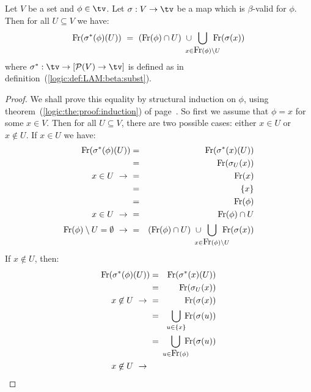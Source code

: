 \begin{prop}\label{logic:prop:LAM:freevar:of:betasubst:gen:valid}
    Let $V$ be a set and $\phi\in\tv$. Let $\sigma:V\to\tv$ be a map 
    which is $\beta$-valid for $\phi$. Then for all $U\subseteq V$ we have:
    \[
        \free(\sigma^{*}(\phi)(U)) 
            \ =\ 
        (\free(\phi)\cap U)
        \ \cup
        \!\!\!\!\!\!
        \bigcup_{x\in\free(\phi)\setminus U} 
        \!\!\!\!\!\!
        \free(\sigma(x))
    \]
    where $\sigma^{*}:\tv\to[{\cal P}(V)\to\tv]$ is defined as in 
    definition~(\ref{logic:def:LAM:beta:subst}).
\end{prop}
\begin{proof}
    We shall prove this equality by structural induction on $\phi$, using
    theorem~(\ref{logic:the:proof:induction}) of 
    page~\pageref{logic:the:proof:induction}. So first we assume that $\phi=x$ 
    for some $x\in V$. Then for all $U\subseteq V$, there are two possible 
    cases: either $x\in U$ or $x\not\in U$. If $x\in U$ we have:
    \begin{eqnarray*}
        \free(\sigma^{*}(\phi)(U))
        &=&\free(\sigma^{*}(x)(U))\\
        &=&\free(\sigma_{U}(x))\\
        \mbox{$x\in U\ \rightarrow\ $}&=&\free(x)\\
         &=&\{x\}\\
         &=&\free(\phi)\\
        \mbox{$x\in U\ \rightarrow\ $}&=&\free(\phi)\cap U\\
        \mbox{$\free(\phi)\setminus U = \emptyset\ \rightarrow\ $} &=& 
            (\free(\phi)\cap U)
            \ \cup
            \!\!\!\!\!\!
            \bigcup_{x\in\free(\phi)\setminus U} 
            \!\!\!\!\!\!
            \free(\sigma(x))
    \end{eqnarray*}
    If $x\not\in U$, then:
    \begin{eqnarray*}
        \free(\sigma^{*}(\phi)(U))
        &=&\free(\sigma^{*}(x)(U))\\
        &=&\free(\sigma_{U}(x))\\
        \mbox{$x\not\in U\ \rightarrow\ $}&=&\free(\sigma(x))\\
        &=&
        \!\!\!
        \bigcup_{u\in\{x\}} 
        \!\!
        \free(\sigma(u))\\
        &=&
        \!\!\!\!\!
        \bigcup_{u\in\free(\phi)} 
        \!\!\!\!
        \free(\sigma(u))\\
        \mbox{$x\not\in U\ \rightarrow\ $}

\end{eqnarray*}
\end{proof}
